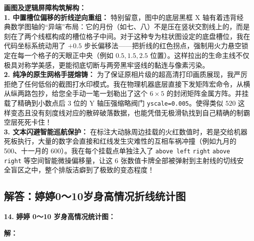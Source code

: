 \vspace{0.4cm}
{\small\color{blue!70!black}
\textbf{画图及逻辑屏障构筑解构：}\\
\textbf{1. 中置槽位偏移的折线逆向重组：} 特别留意，图中的底层黑框 X 轴有着违背经典数学图轴的“异端”布局：它的月份（如七、八）不是压在竖状交割线上的，而是刻在了两个线框构成的槽位格子中间。对于这种专为柱状图设定的底盘槽位，我在代码坐标系统动用了 $+0.5$ 步长偏移法——把折线的红色拐点，强制用火力悬空锁定在每一个格子的天眼正中央（例如 $0.5, 1.5, 2.5$ 位置）。这样拉出的生命主线不仅极具对称学美感，更能彻底切断与两旁黑牢竖线的黏连与像素污染。\\
\textbf{2. 纯净的原生网格手搓熔铸：} 为了保证原相片级的超高清打印画质展现，我严厉拒绝了任何低俗的截图打水印模式。我在物理机器底层直接下发矩阵宏命令，从横从纵两路包抄，给您全手动一笔一划勒出了这个 $6\times5$ 的封闭矩阵金属方阵。并挂载了精确到小数点后 $3$ 位的 $\mathrm{Y}$ 轴压强缩略阀门 \texttt{yscale=0.005}。使得类似 $520$ 这样变态且没有刻度线对应的散碎破落数据，也能凭借无极滑轨找到自己精确的制霸空层死死卡住！\\
\textbf{3. 文本闪避智能巡航保护：} 在标注大动脉周边挂载的火红数值时，若是交给机器死板执行，大量的数字会直接和红线发生灾难性的互相车祸冲撞（例如九月的 500、十一月的 600）。我在每个挂载点单独注入了 \texttt{above left} \texttt{right} \texttt{above right} 等空间智能微操偏移量，让这 6 张数值卡牌全部被弹射到主射线的切线安全盲区之中，整个排版洁癖到了极致的变态程度！
}
\newpage

\newpage

\subsection{解答：婷婷0～10岁身高情况折线统计图}

\vspace{0.6cm}

\textbf{\LARGE 14.} \textbf{婷婷 0～10 岁身高情况统计图：}

\vspace{0.6cm}
\textbf{解：}

